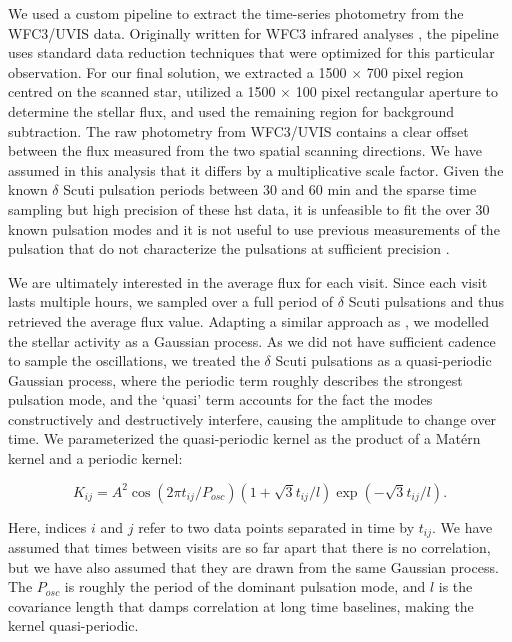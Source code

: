 \documentclass[longauth]{aa} %
\begin{document}
We used a custom pipeline to extract the time-series photometry from the WFC3/UVIS data.  Originally written for WFC3 infrared analyses \citep[e.g.][]{Stevenson2014a, Stevenson2014c}, the pipeline uses standard data reduction techniques that were optimized for this particular observation.  For our final solution, we extracted a 1500 $\times$ 700 pixel region centred on the scanned star, utilized a 1500 $\times$ 100 pixel rectangular aperture to determine the stellar flux, and used the remaining region for background subtraction.
%
The raw photometry from WFC3/UVIS contains a clear offset between the flux measured from the two spatial scanning directions.
%
We have assumed in this analysis that it differs by a multiplicative scale factor.
%
Given the known $\delta$ Scuti pulsation periods between 30 and 60 min \citep{koen2003a, koen2003b} and the sparse time sampling but high precision of these \ac{hst} data, it is unfeasible to fit the over 30 known pulsation modes and it is not useful to use previous measurements of the pulsation that do not characterize the pulsations at sufficient precision \citep{Mekarnia2017}.


We are ultimately interested in the average flux for each visit.
%
Since each visit lasts multiple hours, we sampled over a full period of $\delta$ Scuti pulsations and thus retrieved the average flux value.
%
Adapting a similar approach as \citet{Johnson2015}, we modelled the stellar activity as a Gaussian process.
%
As we did not have sufficient cadence to sample the oscillations, we treated the $\delta$ Scuti pulsations as a quasi-periodic Gaussian process, where the periodic term roughly describes the strongest pulsation mode, and the `quasi' term accounts for the fact the modes constructively and destructively interfere, causing the amplitude to change over time.
%
We parameterized the quasi-periodic kernel as the product of a Mat\'ern kernel and a periodic kernel:

\begin{equation}
 K_{ij} = A^2 \cos\left(2\pi t_{ij}/P_{osc}\right) (1 + \sqrt{3}t_{ij}/l) \exp\left(-\sqrt{3}t_{ij}/l\right).
\end{equation}

Here, indices $i$ and $j$ refer to two data points separated in time by $t_{ij}$.
%
We have assumed that times between visits are so far apart that there is no correlation, but we have also assumed that they are drawn from the same Gaussian process. The $P_{osc}$ is roughly the period of the dominant pulsation mode, and $l$ is the covariance length that damps correlation at long time baselines, making the kernel quasi-periodic.
\end{document}
